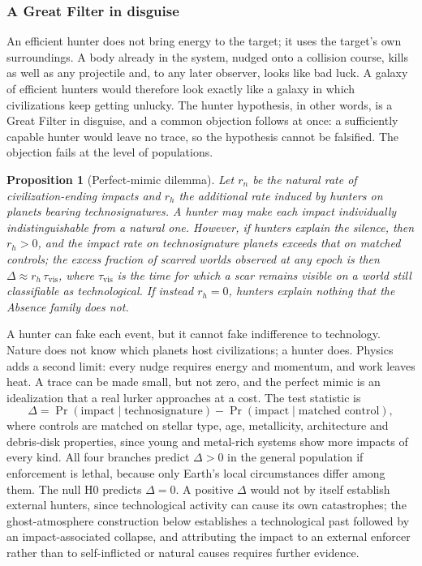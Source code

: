 \documentclass[preprint,12pt]{elsarticle}
\newtheorem{proposition}{Proposition}
\theoremstyle{definition}
\begin{document}
\subsubsection{A Great Filter in disguise}

An efficient hunter does not bring energy to the target; it uses the target's own surroundings. A body already in the system, nudged onto a collision course, kills as well as any projectile and, to any later observer, looks like bad luck. A galaxy of efficient hunters would therefore look exactly like a galaxy in which civilizations keep getting unlucky. The hunter hypothesis, in other words, is a Great Filter in disguise, and a common objection follows at once: a sufficiently capable hunter would leave no trace, so the hypothesis cannot be falsified. The objection fails at the level of populations.

\begin{proposition}[Perfect-mimic dilemma]
\label{prop:mimic}
Let $r_{n}$ be the natural rate of civilization-ending impacts and $r_{h}$ the additional rate induced by hunters on planets bearing technosignatures. A hunter may make each impact individually indistinguishable from a natural one. However, if hunters explain the silence, then $r_{h} > 0$, and the impact rate on technosignature planets exceeds that on matched controls; the excess fraction of scarred worlds observed at any epoch is then $\Delta \approx r_{h}\,\tau_{\mathrm{vis}}$, where $\tau_{\mathrm{vis}}$ is the time for which a scar remains visible on a world still classifiable as technological. If instead $r_{h} = 0$, hunters explain nothing that the Absence family does not.
\end{proposition}

A hunter can fake each event, but it cannot fake indifference to technology. Nature does not know which planets host civilizations; a hunter does. Physics adds a second limit: every nudge requires energy and momentum, and work leaves heat. A trace can be made small, but not zero, and the perfect mimic is an idealization that a real lurker approaches at a cost. The test statistic is
\begin{equation}
\Delta = \Pr(\text{impact} \mid \text{technosignature}) - \Pr(\text{impact} \mid \text{matched control}),
\end{equation}
where controls are matched on stellar type, age, metallicity, architecture and debris-disk properties, since young and metal-rich systems show more impacts of every kind. All four branches predict $\Delta > 0$ in the general population if enforcement is lethal, because only Earth's local circumstances differ among them. The null H0 predicts $\Delta = 0$. A positive $\Delta$ would not by itself establish external hunters, since technological activity can cause its own catastrophes; the ghost-atmosphere construction below establishes a technological past followed by an impact-associated collapse, and attributing the impact to an external enforcer rather than to self-inflicted or natural causes requires further evidence.
\end{document}
